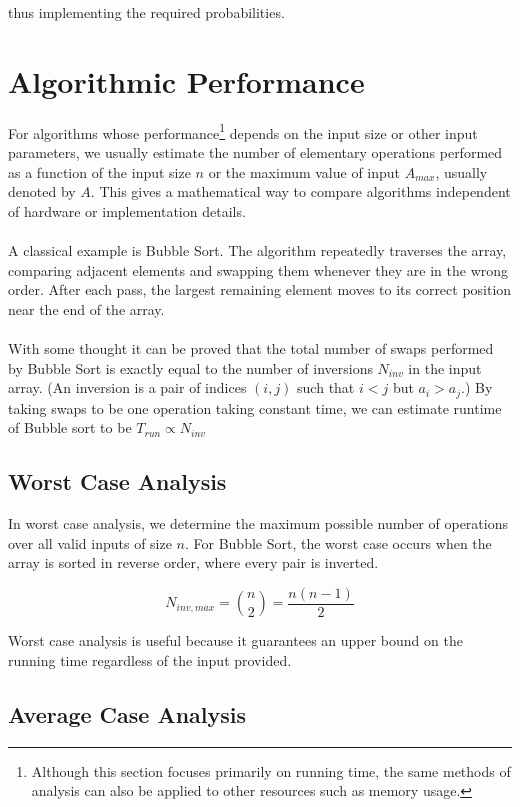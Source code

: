 \documentclass[11pt,openany]{book}
\begin{document}
thus implementing the required probabilities.

\chapter{Algorithmic Performance} 

For algorithms whose performance\footnote{
Although this section focuses primarily on running time, the same methods of analysis can also be applied to other resources such as memory usage.
} depends on the input size or other input parameters, we usually estimate the number of elementary operations performed as a function of the input size \(n\) or the maximum value of input $A_{max}$, usually denoted by $A$. This gives a mathematical way to compare algorithms independent of hardware or implementation details.
\\\\
A classical example is Bubble Sort. The algorithm repeatedly traverses the array, comparing adjacent elements and swapping them whenever they are in the wrong order. After each pass, the largest remaining element moves to its correct position near the end of the array.
\\\\
With some thought it can be proved that the total number of swaps performed by Bubble Sort is exactly equal to the number of inversions $N_{inv}$ in the input array. (An inversion is a pair of indices \((i,j)\) such that \(i<j\) but \(a_i>a_j\).) By taking swaps to be one operation taking constant time, we can estimate runtime of Bubble sort to be $T_{run}\propto N_{inv}$

\section{Worst Case Analysis}

In worst case analysis, we determine the maximum possible number of operations over all valid inputs of size \(n\). For Bubble Sort, the worst case occurs when the array is sorted in reverse order, where every pair is inverted. 

\[N_{inv,max}=\binom{n}{2}=
\frac{n(n-1)}{2}
\]

Worst case analysis is useful because it guarantees an upper bound on the running time regardless of the input provided.

\section{Average Case Analysis} 
\end{document}

